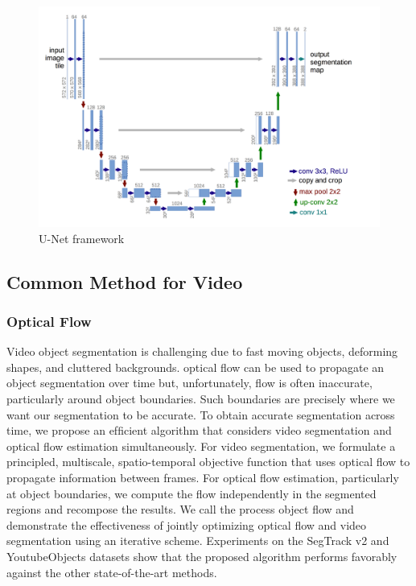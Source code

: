 \begin{figure}
    \begin{center}
        \includegraphics[width=\textwidth]{figure/unet.png}
    \end{center}
    \caption{U-Net framework}
    \label{unet}
\end{figure}


\subsection{Common Method for Video}

\subsubsection{Optical Flow}
Video object segmentation is challenging due to fast moving objects, deforming shapes, and cluttered backgrounds. optical flow can be used to propagate an object segmentation over time but, unfortunately, flow is often inaccurate, particularly around object boundaries. Such boundaries are precisely where we want our segmentation to be accurate. To obtain accurate segmentation across time,  we propose an efﬁcient algorithm that considers video segmentation and optical ﬂow estimation simultaneously. For video segmentation, we formulate a principled, multiscale, spatio-temporal objective function that uses optical ﬂow to propagate information between frames. For optical ﬂow estimation, particularly at object boundaries, we compute the ﬂow independently in the segmented regions and recompose the results. We call the process object ﬂow and demonstrate the effectiveness of jointly optimizing optical ﬂow and video segmentation using an iterative scheme. Experiments on the SegTrack v2 and YoutubeObjects datasets show that the proposed algorithm performs favorably against the other state-of-the-art methods.

